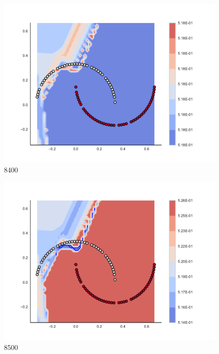 \begin{subfigure}[b]{0.09\textwidth}
    \includegraphics[clip, trim=2.35cm 1.75cm 4.5cm 0cm,width=\textwidth]{img/convergence/8400.pdf}
    \caption{8400}
    \label{fig:convergence_8400}
\end{subfigure}
%
\begin{subfigure}[b]{0.09\textwidth}
    \includegraphics[clip, trim=2.35cm 1.75cm 4.5cm 0cm,width=\textwidth]{img/convergence/8500.pdf}
    \caption{8500}
    \label{fig:convergence_8500}
\end{subfigure}
%
